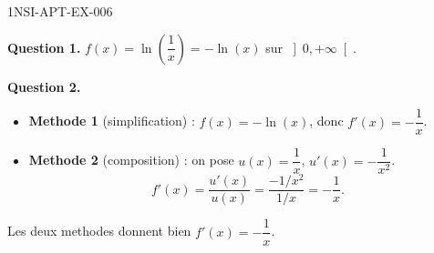 \begin{corrige}{1NSI-APT-EX-006}

\textbf{Question 1.} $f(x) = \ln\!\left(\dfrac{1}{x}\right) = -\ln(x)$ sur $\left]0,+\infty\right[$.


\textbf{Question 2.}
\begin{itemize}
  \item \textbf{Methode 1} (simplification) : $f(x) = -\ln(x)$, donc $f'(x) = -\dfrac{1}{x}$.
  \item \textbf{Methode 2} (composition) : on pose $u(x) = \dfrac{1}{x}$, $u'(x) = -\dfrac{1}{x^2}$.
  \[ f'(x) = \frac{u'(x)}{u(x)} = \frac{-1/x^2}{1/x} = -\frac{1}{x}. \]
\end{itemize}
Les deux methodes donnent bien $f'(x) = -\dfrac{1}{x}$.

\end{corrige}
